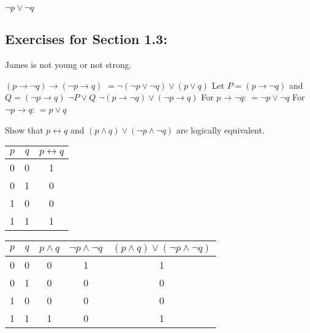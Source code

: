 \documentclass[12pt]{article}  %
\newcommand{\NOT}{\neg}
\newcommand{\AND}{\wedge}
\newcommand{\OR}{\vee}
\newcommand{\IMPLIES}{\rightarrow}
\newcommand{\IFF}{\leftrightarrow}
\begin{document}
\newline
$\displaystyle\NOT{p}\OR{\NOT{q}}$
\clearpage


\subsection*{Exercises for Section 1.3:}     

\newline
James is not young or not strong.

\newline
$(p\IMPLIES\NOT{q})\IMPLIES(\NOT{p}\IMPLIES q)$\newline
$=\NOT{(\NOT{p}\OR{\NOT{q}})}\OR{(p\OR{q})}$\newline
\newline
Let $P=(p\IMPLIES\NOT{q})$ and ${Q=(\NOT{p}\IMPLIES q)}$\newline
$\NOT{P}\OR{Q}$\newline
$\NOT{(p\IMPLIES{\NOT{q}})}\OR{(\NOT{p}\IMPLIES q)}$\newline
\newline
For $p\IMPLIES{\NOT{q}}$:\newline
$=\NOT{p}\OR{\NOT{q}}$\newline
\newline
For $\NOT{p}\IMPLIES{q}$:
\newline
$=p\OR{q}$\newline

\newline
Show that $p\IFF{q}$ and $(p\AND{q})\OR{(\NOT{p}\AND{\NOT{q}})}$ are logically equivalent.


\begin{tabular}{c|c|c}
    $p$ & $q$ & $p\IFF q$  \\
    \hline
    0 & 0 & 1 \\
    \hline
    0 & 1 & 0 \\
    \hline
    1 & 0 & 0 \\
    \hline
    1 & 1 & 1 \\
\end{tabular}

\begin{tabular}{c|c|c|c|c}
    $p$ & $q$ & $p\AND{q}$ & $\NOT{p}\AND\NOT{q}$ & $(p\AND q)\OR(\NOT{p}\AND\NOT q)$ \\
    \hline
    0 & 0 & 0 & 1 & 1\\
    \hline
    0 & 1 & 0 & 0 & 0\\
    \hline
    1 & 0 & 0 & 0 & 0\\
    \hline
    1 & 1 & 1 & 0 & 1\\
\end{tabular}
\end{document}
